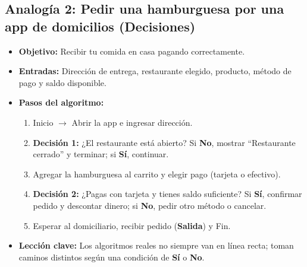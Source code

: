 \documentclass[11pt,letterpaper]{article}
\begin{document}
\subsection{Analogía 2: Pedir una hamburguesa por una app de domicilios (Decisiones)}
\begin{itemize}
  \item \textbf{Objetivo:} Recibir tu comida en casa pagando correctamente.
  \item \textbf{Entradas:} Dirección de entrega, restaurante elegido, producto, método de pago y saldo disponible.
  \item \textbf{Pasos del algoritmo:}
    \begin{enumerate}
      \item Inicio $\rightarrow$ Abrir la app e ingresar dirección.
      \item \textbf{Decisión 1:} ¿El restaurante está abierto? Si \textbf{No}, mostrar ``Restaurante cerrado'' y terminar; si \textbf{Sí}, continuar.
      \item Agregar la hamburguesa al carrito y elegir pago (tarjeta o efectivo).
      \item \textbf{Decisión 2:} ¿Pagas con tarjeta y tienes saldo suficiente? Si \textbf{Sí}, confirmar pedido y descontar dinero; si \textbf{No}, pedir otro método o cancelar.
      \item Esperar al domiciliario, recibir pedido (\textbf{Salida}) y Fin.
    \end{enumerate}
  \item \textbf{Lección clave:} Los algoritmos reales no siempre van en línea recta; toman caminos distintos según una condición de \textbf{Sí} o \textbf{No}.
\end{itemize}
\end{document}
